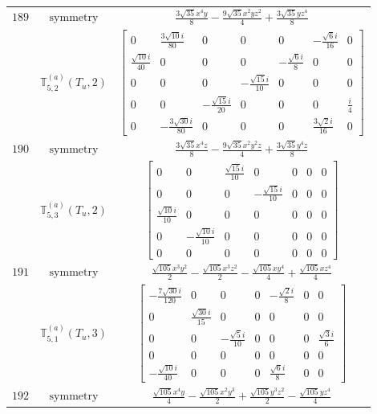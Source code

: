 \documentclass[fleqn,8pt,landscape]{jsarticle}
\begin{document}
\begin{longtable}{ccc}
$ 189 $ & $ \text{symmetry} $ & $ \frac{3 \sqrt{35} x^{4} y}{8} - \frac{9 \sqrt{35} x^{2} y z^{2}}{4} + \frac{3 \sqrt{35} y z^{4}}{8} $ \\
$  $ & $ \mathbb{T}_{5,2}^{(a)}(T_{u},2) $ & $ \begin{bmatrix} 0 & \frac{3 \sqrt{10} i}{80} & 0 & 0 & 0 & - \frac{\sqrt{6} i}{16} & 0 \\ \frac{\sqrt{10} i}{40} & 0 & 0 & 0 & - \frac{\sqrt{6} i}{8} & 0 & 0 \\ 0 & 0 & 0 & - \frac{\sqrt{15} i}{10} & 0 & 0 & 0 \\ 0 & 0 & - \frac{\sqrt{15} i}{20} & 0 & 0 & 0 & \frac{i}{4} \\ 0 & - \frac{3 \sqrt{30} i}{80} & 0 & 0 & 0 & \frac{3 \sqrt{2} i}{16} & 0 \end{bmatrix} $ \\ \hline
$ 190 $ & $ \text{symmetry} $ & $ \frac{3 \sqrt{35} x^{4} z}{8} - \frac{9 \sqrt{35} x^{2} y^{2} z}{4} + \frac{3 \sqrt{35} y^{4} z}{8} $ \\
$  $ & $ \mathbb{T}_{5,3}^{(a)}(T_{u},2) $ & $ \begin{bmatrix} 0 & 0 & \frac{\sqrt{15} i}{10} & 0 & 0 & 0 & 0 \\ 0 & 0 & 0 & - \frac{\sqrt{15} i}{10} & 0 & 0 & 0 \\ \frac{\sqrt{10} i}{10} & 0 & 0 & 0 & 0 & 0 & 0 \\ 0 & - \frac{\sqrt{10} i}{10} & 0 & 0 & 0 & 0 & 0 \\ 0 & 0 & 0 & 0 & 0 & 0 & 0 \end{bmatrix} $ \\ \hline
$ 191 $ & $ \text{symmetry} $ & $ \frac{\sqrt{105} x^{3} y^{2}}{2} - \frac{\sqrt{105} x^{3} z^{2}}{2} - \frac{\sqrt{105} x y^{4}}{4} + \frac{\sqrt{105} x z^{4}}{4} $ \\
$  $ & $ \mathbb{T}_{5,1}^{(a)}(T_{u},3) $ & $ \begin{bmatrix} - \frac{7 \sqrt{30} i}{120} & 0 & 0 & 0 & - \frac{\sqrt{2} i}{8} & 0 & 0 \\ 0 & \frac{\sqrt{30} i}{15} & 0 & 0 & 0 & 0 & 0 \\ 0 & 0 & - \frac{\sqrt{5} i}{10} & 0 & 0 & 0 & \frac{\sqrt{3} i}{6} \\ 0 & 0 & 0 & 0 & 0 & 0 & 0 \\ - \frac{\sqrt{10} i}{40} & 0 & 0 & 0 & \frac{\sqrt{6} i}{8} & 0 & 0 \end{bmatrix} $ \\ \hline
$ 192 $ & $ \text{symmetry} $ & $ \frac{\sqrt{105} x^{4} y}{4} - \frac{\sqrt{105} x^{2} y^{3}}{2} + \frac{\sqrt{105} y^{3} z^{2}}{2} - \frac{\sqrt{105} y z^{4}}{4} $ \\

\end{longtable}
\end{document}
